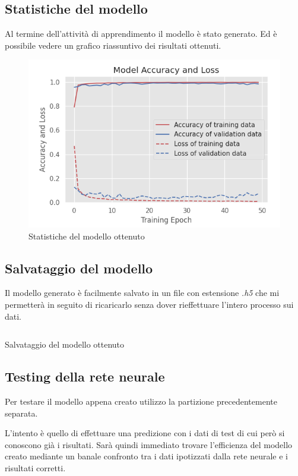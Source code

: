 \newpage
\subsection{Statistiche del modello}
Al termine dell'attività di apprendimento il modello è stato generato. Ed è possibile vedere un grafico 
riassuntivo dei risultati ottenuti.
\begin{figure}[H]
    \centering
    \includegraphics[scale = 0.80]{assets/images/classifications/accelerometer/right_hand/model-right-hand-acc.png}
    \caption{Statistiche del modello ottenuto}
\end{figure}


\subsection{Salvataggio del modello}
Il modello generato è facilmente salvato in un file con estensione \textit{.h5} che mi permetterà in seguito 
di ricaricarlo senza dover rieffettuare l'intero processo sui dati.
\begin{listing}[H] 
    \inputminted[frame=single,framesep=10pt]{python}{assets/snippets/classifier/save_model.py}
    \caption{Salvataggio del modello ottenuto}
\end{listing}


\subsection{Testing della rete neurale}
Per testare il modello appena creato utilizzo la partizione precedentemente separata.

L'intento è quello di effettuare una predizione con i dati di test di cui però si conoscono già i risultati. 
Sarà quindi immediato trovare l'efficienza del modello creato mediante un banale confronto tra i dati ipotizzati 
dalla rete neurale e i risultati corretti.

